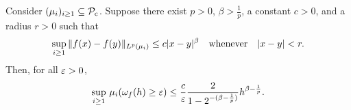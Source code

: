 \documentclass[12pt, twoside]{report}
\begin{document}
\begin{proposition} \label{prop:uniform_control_modulus_of_continuity}
    Consider $(\mu_i)_{i\ge1} \sub \mathcal{P}\ss{c}$.
    Suppose there exist $p > 0$, $\beta > \tfrac1p$, a constant $c > 0$, and a radius $r > 0$ such that
    \begin{equation}
        \operatorname*{sup}_{i \ge 1}\,
        \lVert f(x) - f(y)\rVert_{L^p(\mu_i)} \le c \lvert x - y\rvert^\beta
        \quad\text{whenever}\quad
        \lvert x - y\rvert < r.
    \end{equation}
    Then, for all $\varepsilon > 0$,
    \begin{equation}
        \operatorname*{sup}_{i \ge 1}\, \mu_i(\omega_f(h) \ge \varepsilon)
        \le \frac{c}{\varepsilon} \frac{2}{1 - 2^{-(\beta - \frac1p)}} h^{\beta - \frac1p}.
    \end{equation}
\end{proposition}
\end{document}
